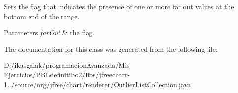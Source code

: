 Sets the flag that indicates the presence of one or more far out values at the bottom end of the range.


\begin{DoxyParams}{Parameters}
{\em far\+Out} & the flag. \\
\hline
\end{DoxyParams}


The documentation for this class was generated from the following file\+:\begin{DoxyCompactItemize}
\item 
D\+:/ikasgaiak/programacion\+Avanzada/\+Mis Ejercicios/\+P\+B\+Ldefinitibo2/libs/jfreechart-\/1../source/org/jfree/chart/renderer/\mbox{\hyperlink{_outlier_list_collection_8java}{Outlier\+List\+Collection.\+java}}\end{DoxyCompactItemize}
